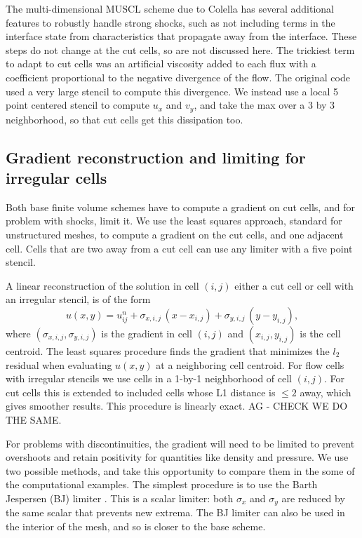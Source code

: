 The multi-dimensional MUSCL scheme due to Colella has several additional
features to robustly handle strong shocks, such as not including terms in the
interface state from characteristics that propagate away from the interface. These
steps do not change at the cut cells, so are not discussed here.  The
trickiest term to adapt to cut cells was an artificial viscosity 
added to each flux with a
coefficient proportional to the negative divergence of the flow.  The original
code used a very large stencil to compute this divergence. We instead use a local 5
point centered stencil to compute $u_x$ and $v_y$, and take the max over a 3 by 3
neighborhood, so that cut cells get this dissipation too.

\subsection{Gradient reconstruction and limiting for irregular
cells}\label{sec:limit}

Both base finite volume schemes have to compute a gradient on cut cells, and for
problem with shocks, limit it. 
We use the least squares approach, standard for unstructured meshes,
to compute a gradient on the cut cells, and one adjacent cell.
Cells that are two away from a cut cell
can use any limiter with a five point stencil. 

A linear reconstruction of the solution in cell $(i,j)$
either a cut cell or cell with an irregular stencil, is of the form
\begin{equation}
u(x,y) = u_{ij}^n + \sigma_{x,i,j} \,(x-x_{i,j}) +
                     \sigma_{y,i,j}\,(y-y_{i,j}),
\label{eqn:lls}
\end{equation}
where $(\sigma_{x,i,j},\sigma_{y,i,j})$ is the gradient in 
cell $(i,j)$ and $(x_{i,j},y_{i,j})$ is the cell centroid. The least squares procedure
finds the gradient that minimizes the $l_2$ residual when evaluating  $u(x,y)$
at a neighboring cell centroid. 
For flow cells with irregular stencils we use cells in a 1-by-1
neighborhood of cell $(i,j)$.
For cut cells this is extended to included cells whose L1 distance is $\le
2$ away, which gives smoother results.
This procedure is linearly exact. AG - CHECK WE DO THE SAME.  

For problems with discontinuities, the gradient will need to be limited
to prevent overshoots and retain positivity for quantities like density and
pressure.
We use two possible methods, and take this opportunity to
compare them in the some of the 
computational examples.
The simplest procedure  is to use the Barth Jespersen (BJ) limiter
\cite{barth-jespersen}. 
This is a scalar limiter: both $\sigma_x$ and $\sigma_y$ are reduced by
the same scalar that prevents new extrema.  The BJ limiter  can also be
used in the interior of the mesh, and so is closer to the base scheme. 

